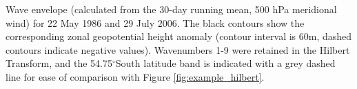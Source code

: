 \label{fig:example_envelope}
Wave envelope (calculated from the 30-day running mean, 500 hPa meridional wind) for 22 May 1986 and 29 July 2006. The black contours show the corresponding zonal geopotential height anomaly (contour interval is 60m, dashed contours indicate negative values). Wavenumbers 1-9 were retained in the Hilbert Transform, and the 54.75$^{\circ}$South latitude band is indicated with a grey dashed line for ease of comparison with Figure \ref{fig:example_hilbert}. 